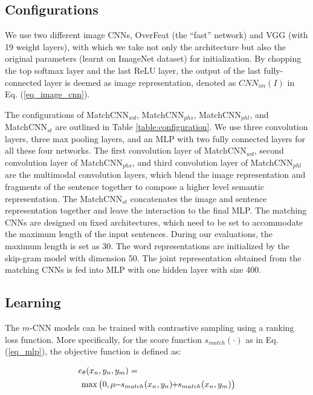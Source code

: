 \documentclass[10pt,twocolumn,letterpaper]{article}
\begin{document}
\subsection{Configurations}



We use two different image CNNs,  OverFeat \cite{sermanet_arxiv2014} (the ``fast'' network) and VGG \cite{simonyan_arxiv2014} (with 19 weight layers), with which we take not only the architecture but also the original parameters (learnt on ImageNet dataset) for initialization. By chopping the top softmax layer and the last ReLU layer, the output of the last fully-connected layer is deemed as image representation, denoted as $CNN_{im}(I)$  in Eq. (\ref{eq_image_cnn}).

The configurations of MatchCNN$_{wd}$, MatchCNN$_{phs}$, MatchCNN$_{phl}$, and MatchCNN$_{st}$ are outlined in Table \ref{table:configuration}. We use three convolution layers, three max pooling layers, and an MLP with two fully connected layers for all these four networks. The first convolution layer of MatchCNN$_{wd}$, second convolution layer of MatchCNN$_{phs}$, and third convolution layer of MatchCNN$_{phl}$ are the multimodal convolution layers, which blend the image representation and fragments of the sentence together to compose a higher level semantic representation. The MatchCNN$_{st}$ concatenates the image and sentence representation together and leave the interaction to the final MLP. The matching CNNs are designed on fixed architectures, which need to be set to accommodate the maximum length of the input sentences. During our evaluations, the maximum length is set as 30. The word representations are initialized by the skip-gram model \cite{mikolov_iclr2013} with dimension 50. The joint representation obtained from the matching CNNs is fed into MLP with one hidden layer with size 400.








\subsection{Learning}
\label{sec_learning}
The $m$-CNN models can be trained with contrastive sampling using a ranking loss function. More specifically, for the score function $s_{match}(\cdot)$ as in Eq. (\ref{eq_mlp}), the objective function is defined as:

\begin{equation}
\label{eq_objective}
\begin{split}
\small
e_{\theta}(x_n,y_n,y_m) = \hspace{-4pt} \qquad \qquad \quad \qquad \qquad \qquad \qquad   \\
\max \big(0,\mu\hspace{-3pt}- \hspace{-3pt}s_{match}(x_n,y_n)\hspace{-3pt}+\hspace{-3pt}s_{match}(x_n,y_m)\big)
\end{split}
\end{equation}
\end{document}

